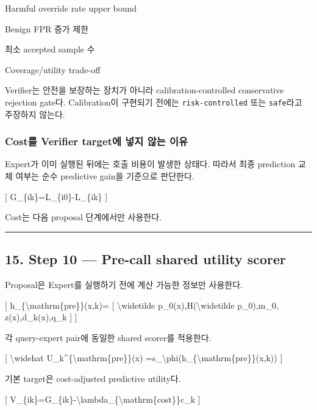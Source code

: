 \par\noindent \textbullet\enspace Harmful override rate upper bound


\par\noindent \textbullet\enspace Benign FPR 증가 제한


\par\noindent \textbullet\enspace 최소 accepted sample 수


\par\noindent \textbullet\enspace Coverage/\allowbreak{}utility trade-off


Verifier는 안전을 보장하는 장치가 아니라 calibration-controlled conservative rejection gate다. Calibration이 구현되기 전에는 \texttt{risk-\allowbreak{}con\allowbreak{}trolled} 또는 \texttt{safe}라고 주장하지 않는다.

\subsubsection{Cost를 Verifier target에 넣지 않는 이유}
Expert가 이미 실행된 뒤에는 호출 비용이 발생한 상태다. 따라서 최종 prediction 교체 여부는 순수 predictive gain을 기준으로 판단한다.

[ G\_\allowbreak{}\{ik\}=\allowbreak{}L\_\allowbreak{}\{i0\}-L\_\allowbreak{}\{ik\} ]

Cost는 다음 proposal 단계에서만 사용한다.


\medskip\hrule\medskip
\subsection{15. Step 10 — Pre-call shared utility scorer}
Proposal은 Expert를 실행하기 전에 계산 가능한 정보만 사용한다.

[ h\_\allowbreak{}\{\textbackslash{}mathrm\{pre\}\}(x,k)=\allowbreak{} [ \textbackslash{}widetilde p\_\allowbreak{}0(x),H(\textbackslash{}widetilde p\_\allowbreak{}0),m\_\allowbreak{}0, z(x),d\_\allowbreak{}k(x),q\_\allowbreak{}k ] ]

각 query-expert pair에 동일한 shared scorer를 적용한다.

[ \textbackslash{}widehat U\_\allowbreak{}k\textasciicircum{}\{\textbackslash{}mathrm\{pre\}\}(x) =\allowbreak{}s\_\allowbreak{}\textbackslash{}phi(h\_\allowbreak{}\{\textbackslash{}mathrm\{pre\}\}(x,k)) ]

기본 target은 cost-adjusted predictive utility다.

[ V\_\allowbreak{}\{ik\}=\allowbreak{}G\_\allowbreak{}\{ik\}-\textbackslash{}lambda\_\allowbreak{}\{\textbackslash{}mathrm\{cost\}\}c\_\allowbreak{}k ]

